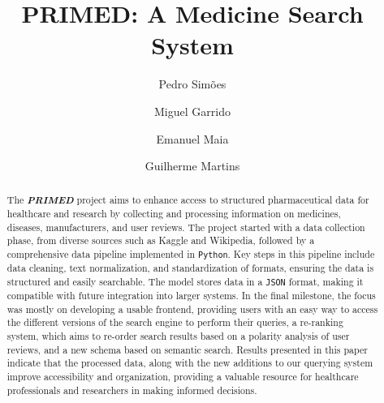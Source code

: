 \documentclass[sigconf]{acmart}
\begin{document}
\title{PRIMED: A Medicine Search System}

\author{Pedro Simões}

\author{Miguel Garrido}

\author{Emanuel Maia}

\author{Guilherme Martins}

\renewcommand{\shortauthors}{Pedro Simões, Miguel Garrido, Emanuel Maia and Guilherme Martins}

\begin{abstract}
The \textit{\textbf{PRIMED}} project aims to enhance access to structured pharmaceutical data for healthcare and research by collecting and processing information on medicines, diseases, manufacturers, and user reviews. The project started with a data collection phase, from diverse sources such as Kaggle and Wikipedia, followed by a comprehensive data pipeline implemented in \texttt{Python}. Key steps in this pipeline include data cleaning, text normalization, and standardization of formats, ensuring the data is structured and easily searchable. The model stores data in a \texttt{JSON} format, making it compatible with future integration into larger systems. In the final milestone, the focus was mostly on developing a usable frontend, providing users with an easy way to access the different versions of the search engine to perform their queries, a re-ranking system, which aims to re-order search results based on a polarity analysis of user reviews, and a new schema based on semantic search. Results presented in this paper indicate that the processed data, along with the new additions to our querying system improve accessibility and organization, providing a valuable resource for healthcare professionals and researchers in making informed decisions.  \end{abstract}
\end{document}
